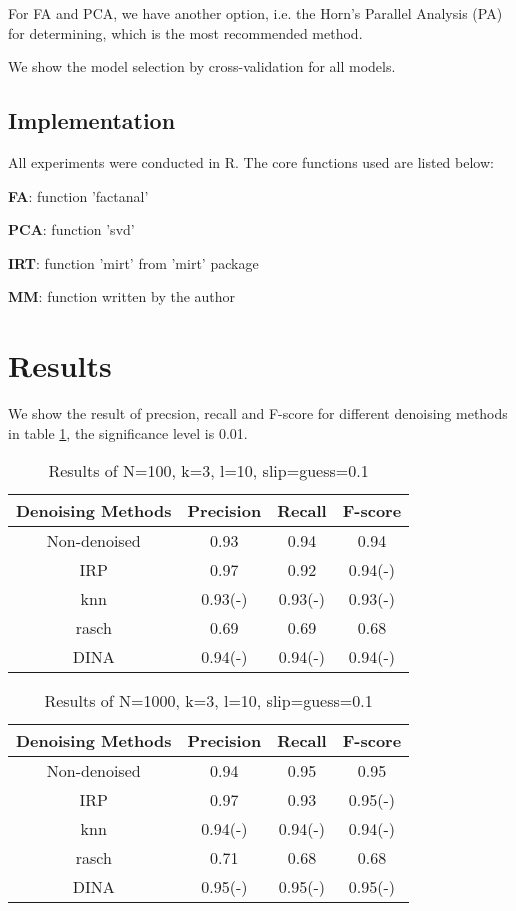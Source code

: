 \documentclass[11pt]{article}
\begin{document}
For FA and PCA, we have another option, i.e. the Horn's Parallel Analysis (PA) \cite{horn1965rationale}for determining, which is the most recommended method\cite{hayton2004factor}. 

We show the model selection by cross-validation for all models. %
\subsection{Implementation}
All experiments were conducted in R. The core functions used are listed below:
 
\textbf{FA}: function 'factanal'
  
\textbf{PCA}: function 'svd' 

\textbf{IRT}: function 'mirt' from 'mirt' package  

\textbf{MM}: function written by the author

\section{Results}
We show the result of precsion, recall and F-score for different denoising methods in table \ref{tab:results1}, the significance level is 0.01.

\begin{table}[!h]
\begin{center}
\begin{tabular}{|c|c|c|c|}
\hline
Denoising Methods & Precision & Recall & F-score\\
\hline
Non-denoised & 0.93 & 0.94 & 0.94  \\
\hline
IRP & 0.97 & 0.92 & 0.94(-) \\
\hline
knn & 0.93(-) & 0.93(-) & 0.93(-) \\
\hline
rasch & 0.69 & 0.69 & 0.68 \\
\hline
DINA & 0.94(-) & 0.94(-) & 0.94(-) \\
\hline
\end{tabular}
\end{center}
\caption{Results of N=100, k=3, l=10, slip=guess=0.1}\label{tab:results1}
\end{table}


\begin{table}[!h]
\begin{center}
\begin{tabular}{|c|c|c|c|}
\hline
Denoising Methods & Precision & Recall & F-score\\
\hline
Non-denoised & 0.94 & 0.95 & 0.95  \\
\hline
IRP & 0.97 & 0.93 & 0.95(-) \\
\hline
knn & 0.94(-) & 0.94(-) & 0.94(-) \\
\hline
rasch & 0.71 & 0.68 & 0.68 \\
\hline
DINA & 0.95(-) & 0.95(-) & 0.95(-) \\
\hline
\end{tabular}
\end{center}
\caption{Results of N=1000, k=3, l=10, slip=guess=0.1}\label{tab:results2}
\end{table}
\end{document}

